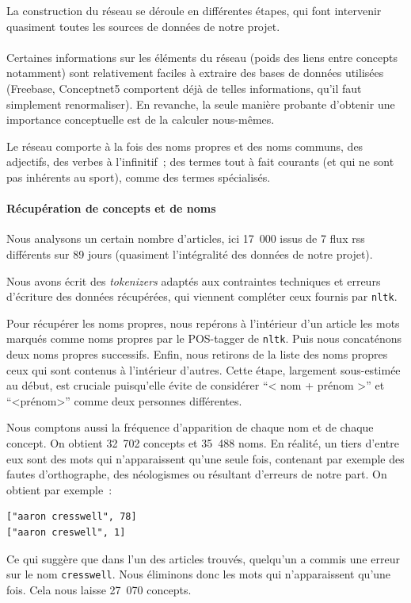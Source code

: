 \documentclass[a4paper, 12pt]{article}
\newcommand{\pyt}[1]{\texttt{#1}}%
\newcommand{\ang}[1]{\textit{#1}}%
\begin{document}
La construction du réseau se déroule en différentes étapes, qui font intervenir quasiment toutes les sources de données de notre projet.


\paragraph{}
Certaines informations sur les éléments du réseau (poids des liens entre concepts notamment) sont relativement faciles à extraire des bases de données utilisées (Freebase, Conceptnet5 comportent déjà de telles informations, qu'il faut simplement renormaliser). En revanche, la seule manière probante d'obtenir une importance conceptuelle est de la calculer nous-mêmes.

Le réseau comporte à la fois des noms propres et des noms communs, des adjectifs, des verbes à l'infinitif~; des termes tout à fait courants (et qui ne sont pas inhérents au sport), comme des termes spécialisés.



\paragraph{Récupération de concepts et de noms}

Nous analysons un certain nombre d'articles, ici 17~000 issus de 7 flux rss différents sur 89 jours (quasiment l'intégralité des données de notre projet).


Nous avons écrit des \ang{tokenizers} adaptés aux contraintes techniques et erreurs d'écriture des données récupérées, qui viennent compléter ceux fournis par \pyt{nltk}.

Pour récupérer les noms propres, nous repérons à l'intérieur d'un article les mots marqués comme noms propres par le POS-tagger de \pyt{nltk}. Puis nous concaténons deux noms propres successifs. Enfin, nous retirons de la liste des noms propres ceux qui sont contenus à l'intérieur d'autres. Cette étape, largement sous-estimée au début, est cruciale puisqu'elle évite de considérer ``< nom + prénom >'' et ``<prénom>'' comme deux personnes différentes.

Nous comptons aussi la fréquence d'apparition de chaque nom et de chaque concept. 
On obtient 32~702 concepts et 35~488 noms. En réalité, un tiers d'entre eux sont des mots qui n'apparaissent qu'une seule fois, contenant par exemple des fautes d'orthographe, des néologismes ou résultant d'erreurs de notre part. On obtient par exemple~:
\begin{verbatim}
["aaron cresswell", 78]
["aaron creswell", 1]
\end{verbatim}
Ce qui suggère que dans l'un des articles trouvés, quelqu'un a commis une erreur sur le nom \verb|cresswell|. Nous éliminons donc les mots qui n'apparaissent qu'une fois. Cela nous laisse 27~070 concepts.
\end{document}

